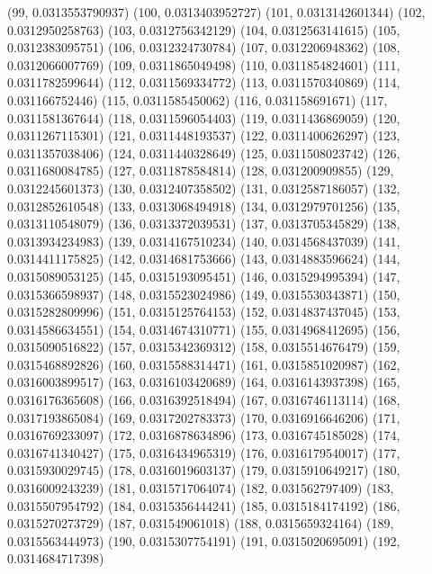 {					(99, 0.0313553790937)
					(100, 0.0313403952727)
					(101, 0.0313142601344)
					(102, 0.0312950258763)
					(103, 0.0312756342129)
					(104, 0.0312563141615)
					(105, 0.0312383095751)
					(106, 0.0312324730784)
					(107, 0.0312206948362)
					(108, 0.0312066007769)
					(109, 0.0311865049498)
					(110, 0.0311854824601)
					(111, 0.0311782599644)
					(112, 0.0311569334772)
					(113, 0.0311570340869)
					(114, 0.031166752446)
					(115, 0.0311585450062)
					(116, 0.031158691671)
					(117, 0.0311581367644)
					(118, 0.0311596054403)
					(119, 0.0311436869059)
					(120, 0.0311267115301)
					(121, 0.0311448193537)
					(122, 0.0311400626297)
					(123, 0.0311357038406)
					(124, 0.0311440328649)
					(125, 0.0311508023742)
					(126, 0.0311680084785)
					(127, 0.0311878584814)
					(128, 0.031200909855)
					(129, 0.0312245601373)
					(130, 0.0312407358502)
					(131, 0.0312587186057)
					(132, 0.0312852610548)
					(133, 0.0313068494918)
					(134, 0.0312979701256)
					(135, 0.0313110548079)
					(136, 0.0313372039531)
					(137, 0.0313705345829)
					(138, 0.0313934234983)
					(139, 0.0314167510234)
					(140, 0.0314568437039)
					(141, 0.0314411175825)
					(142, 0.0314681753666)
					(143, 0.0314883596624)
					(144, 0.0315089053125)
					(145, 0.0315193095451)
					(146, 0.0315294995394)
					(147, 0.0315366598937)
					(148, 0.0315523024986)
					(149, 0.0315530343871)
					(150, 0.0315282809996)
					(151, 0.0315125764153)
					(152, 0.0314837437045)
					(153, 0.0314586634551)
					(154, 0.0314674310771)
					(155, 0.0314968412695)
					(156, 0.0315090516822)
					(157, 0.0315342369312)
					(158, 0.0315514676479)
					(159, 0.0315468892826)
					(160, 0.0315588314471)
					(161, 0.0315851020987)
					(162, 0.0316003899517)
					(163, 0.0316103420689)
					(164, 0.0316143937398)
					(165, 0.0316176365608)
					(166, 0.0316392518494)
					(167, 0.0316746113114)
					(168, 0.0317193865084)
					(169, 0.0317202783373)
					(170, 0.0316916646206)
					(171, 0.0316769233097)
					(172, 0.0316878634896)
					(173, 0.0316745185028)
					(174, 0.0316741340427)
					(175, 0.0316434965319)
					(176, 0.0316179540017)
					(177, 0.0315930029745)
					(178, 0.0316019603137)
					(179, 0.0315910649217)
					(180, 0.0316009243239)
					(181, 0.0315717064074)
					(182, 0.031562797409)
					(183, 0.0315507954792)
					(184, 0.0315356444241)
					(185, 0.0315184174192)
					(186, 0.0315270273729)
					(187, 0.031549061018)
					(188, 0.0315659324164)
					(189, 0.0315563444973)
					(190, 0.0315307754191)
					(191, 0.0315020695091)
					(192, 0.0314684717398)
}
